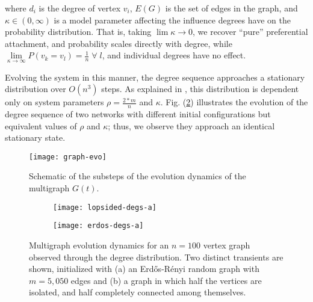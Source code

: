 \documentclass[epjST, final]{svjour}
\begin{document}
\begin{onehalfspace}
\noindent where $d_i$ is the degree of vertex $v_i$, $E(G)$ is the set of edges in the graph, and $\kappa \in (0, \infty)$ is a model parameter affecting the influence degrees have on the probability distribution. That is, taking $\lim\limits{\kappa \rightarrow 0}$, we recover ``pure'' preferential attachment, and probability scales directly with degree, while $\lim\limits_{\kappa \rightarrow \infty} P(v_k = v_l) = \frac{1}{n} \; \forall \; l$, and individual degrees have no effect. \par

Evolving the system in this manner, the degree sequence approaches a stationary distribution over $O(n^3)$ steps. As explained in \cite{rath_time_2009}, this distribution is dependent only on system parameters $\rho = \frac{2*m}{n}$ and $\kappa$. Fig. (\ref{fig:dse}) illustrates the evolution of the degree sequence of two networks with different initial configurations but equivalent values of $\rho$ and $\kappa$; thus, we observe they approach an identical stationary state.

\begin{figure}[ht!]
  \centering
  \texttt{[image: graph-evo]}
  \caption{Schematic of the substeps of the evolution dynamics of the
    multigraph $G(t)$. \label{fig:step-illustration}}
\end{figure}

\begin{figure}[th!]
  \vspace{-5mm}
  \centering
  \begin{subfigure}[t]{0.49\textwidth}
    \centering
    \texttt{[image: lopsided-degs-a]}
    \subcaption{\label{fig:lopsided-init}}
  \end{subfigure} %
  \begin{subfigure}[t]{0.49\textwidth}
    \centering
    \texttt{[image: erdos-degs-a]}
    \subcaption{\label{fig:erdos-init}}
  \end{subfigure}
  \caption{Multigraph evolution dynamics for an $n=100$ vertex graph
    observed through the degree distribution. Two distinct transients
    are shown, initialized with (a) an Erd\H{o}s-R\'{e}nyi random
    graph with $m = 5,050$ edges and (b) a graph in which half the
    vertices are isolated, and half completely connected among
    themselves. \label{fig:dse}}
\end{figure}


\end{onehalfspace}
\end{document}
